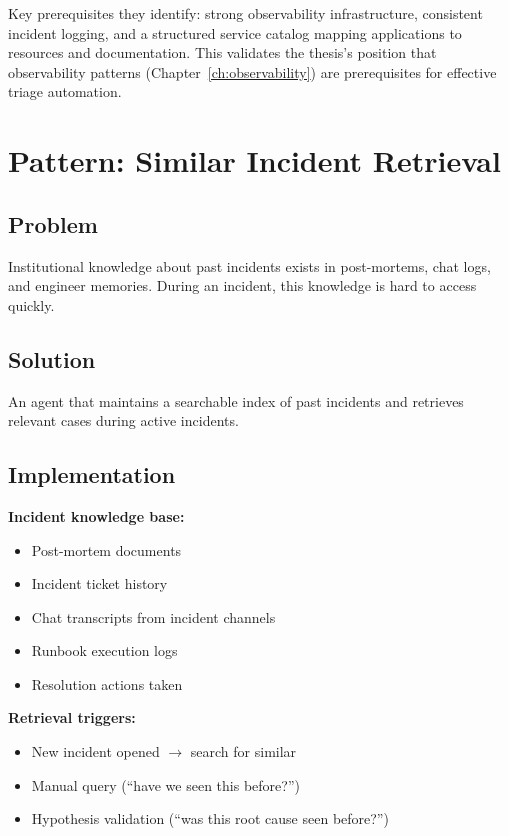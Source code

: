 Key prerequisites they identify: strong observability infrastructure, consistent incident logging, and a structured service catalog mapping applications to resources and documentation. This validates the thesis's position that observability patterns (Chapter~\ref{ch:observability}) are prerequisites for effective triage automation.

\section{Pattern: Similar Incident Retrieval}
\label{sec:similar-incident}

\subsection{Problem}

Institutional knowledge about past incidents exists in post-mortems, chat logs, and engineer memories. During an incident, this knowledge is hard to access quickly.

\subsection{Solution}

An agent that maintains a searchable index of past incidents and retrieves relevant cases during active incidents.

\subsection{Implementation}

\textbf{Incident knowledge base:}
\begin{itemize}
    \item Post-mortem documents
    \item Incident ticket history
    \item Chat transcripts from incident channels
    \item Runbook execution logs
    \item Resolution actions taken
\end{itemize}

\textbf{Retrieval triggers:}
\begin{itemize}
    \item New incident opened $\rightarrow$ search for similar
    \item Manual query (``have we seen this before?'')
    \item Hypothesis validation (``was this root cause seen before?'')
\end{itemize}

